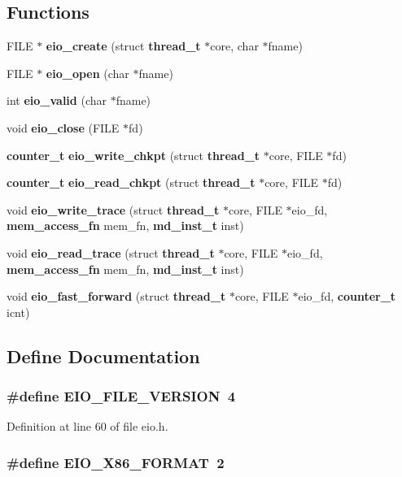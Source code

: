 \subsection*{Functions}
\begin{CompactItemize}
\item 
FILE $\ast$ {\bf eio\_\-create} (struct {\bf thread\_\-t} $\ast$core, char $\ast$fname)
\item 
FILE $\ast$ {\bf eio\_\-open} (char $\ast$fname)
\item 
int {\bf eio\_\-valid} (char $\ast$fname)
\item 
void {\bf eio\_\-close} (FILE $\ast$fd)
\item 
{\bf counter\_\-t} {\bf eio\_\-write\_\-chkpt} (struct {\bf thread\_\-t} $\ast$core, FILE $\ast$fd)
\item 
{\bf counter\_\-t} {\bf eio\_\-read\_\-chkpt} (struct {\bf thread\_\-t} $\ast$core, FILE $\ast$fd)
\item 
void {\bf eio\_\-write\_\-trace} (struct {\bf thread\_\-t} $\ast$core, FILE $\ast$eio\_\-fd, {\bf mem\_\-access\_\-fn} mem\_\-fn, {\bf md\_\-inst\_\-t} inst)
\item 
void {\bf eio\_\-read\_\-trace} (struct {\bf thread\_\-t} $\ast$core, FILE $\ast$eio\_\-fd, {\bf mem\_\-access\_\-fn} mem\_\-fn, {\bf md\_\-inst\_\-t} inst)
\item 
void {\bf eio\_\-fast\_\-forward} (struct {\bf thread\_\-t} $\ast$core, FILE $\ast$eio\_\-fd, {\bf counter\_\-t} icnt)
\end{CompactItemize}


\subsection{Define Documentation}
\subsubsection[{EIO\_\-FILE\_\-VERSION}]{\setlength{\rightskip}{0pt plus 5cm}\#define EIO\_\-FILE\_\-VERSION~4}\label{eio_8h_6b7be7a86a6d5f170b8cdcbaf0e853e4}




Definition at line 60 of file eio.h.
\subsubsection[{EIO\_\-X86\_\-FORMAT}]{\setlength{\rightskip}{0pt plus 5cm}\#define EIO\_\-X86\_\-FORMAT~2}\label{eio_8h_0c5280391433709ef49b31e63db73391}




